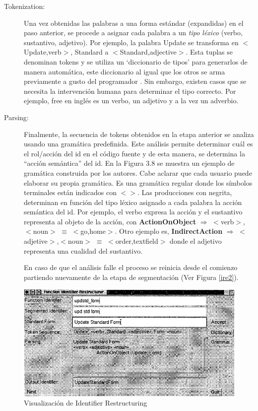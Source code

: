 \begin{description}
\item[Tokenization:] Una vez obtenidas las palabras a una forma estándar (expandidas) en el paso anterior, se procede a asignar cada palabra a un \textit{tipo léxico} (verbo, sustantivo, adjetivo). Por ejemplo, la palabra \mbox{\textsf{Update}} se transforma en $<$Update,verb$>$, \textsf{Standard} a $<$Standard,adjective$>$. Esta tuplas se denominan tokens y se utiliza un `diccionario de tipos' para generarlos de manera automática, este diccionario al igual que los otros se arma previamente a gusto del programador \cite{BCPT99}. Sin embargo, existen casos que se necesita la intervención humana para determinar el tipo correcto. Por ejemplo, \textsf{free} en inglés es un verbo, un adjetivo y a la vez un adverbio.%

\item[Parsing:] Finalmente, la secuencia de tokens obtenidos en la etapa anterior se analiza usando una gramática predefinida. Este análisis permite determinar cuál es el rol/acción del id en el código fuente y de esta manera, se determina la “acción semántica” del id. 
En la Figura 3.8 se muestra un ejemplo de gramática construida por los autores. Cabe aclarar que cada usuario puede elaborar su propia gramática. 
Es una gramática regular donde los símbolos terminales están indicados con $<>$. Las producciones con negrita, determinan en función del tipo léxico asignado a cada palabra la acción semántica del id.
Por ejemplo, el verbo expresa la acción y el sustantivo representa al objeto de la acción, con \textbf{ActionOnObject} $\Rightarrow$ $<$verb$>$,$<$noun$>$ $\equiv$ $<$go,home$>$. Otro ejemplo es, \textbf{IndirectAction} $\Rightarrow$ $<$adjetive$>$,$<$noun$>$ $\equiv$ $<$order,textfield$>$ donde el adjetivo representa una cualidad del sustantivo.

En caso de que el análisis falle el proceso se reinicia desde el comienzo partiendo nuevamente de la etapa de segmentación \cite{BCPT00} (Ver Figura \ref{ire2}).
\end{description}

\begin{figure}[ht] %
\centerline{%
\includegraphics[scale= 0.67]{./cap3/ire_4.png}
}
\caption{Visualización de Identifier Restructuring}
\label{ire4}
\end{figure}

